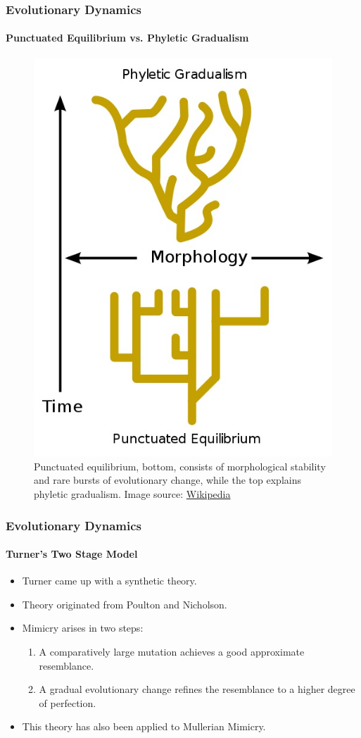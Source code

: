 \frame
{
	\frametitle{Evolutionary Dynamics}
	\framesubtitle{Punctuated Equilibrium vs. Phyletic Gradualism}

	\begin{figure}[H]
		\centering
		\includegraphics[scale=0.3]{../tex/images/Punctuated-equilibrium}
		\caption{Punctuated equilibrium, bottom, consists of morphological stability and rare bursts of evolutionary change, while the top explains phyletic gradualism. Image source: \href{http://en.wikipedia.org/wiki/Punctuated_equilibrium}{Wikipedia}}
		\label{fig:punctuated-equilibrium}
	\end{figure}
}

\frame
{
	\frametitle{Evolutionary Dynamics}
	\framesubtitle{Turner's Two Stage Model}

	\begin{itemize}
		\item Turner came up with a synthetic theory.
		\item Theory originated from Poulton and Nicholson.
		\item Mimicry arises in two steps:
			\begin{enumerate}
				\item A comparatively large mutation achieves a good approximate resemblance.
				\item A gradual evolutionary change refines the resemblance to a higher degree of perfection.
			\end{enumerate}
		\item This theory has also been applied to Mullerian Mimicry.
	\end{itemize}
}


